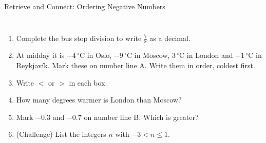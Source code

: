 \documentclass{beamer}
\newcommand{\ashow}[1]{\uncover<2->{\textcolor{red}{\small #1}}}
\newcommand{\abox}[1]{%
  \tikz[baseline=(b.base)]\node[draw=gray, densely dotted, inner sep=1.5pt] (b)
    {\alt<2->{\textcolor{red}{#1}}{\phantom{#1}}};%
}
\newcommand{\tightlist}{%
  \setlength{\itemsep}{0pt}\setlength{\parskip}{0pt}\setlength{\topsep}{0pt}%
}
\newcommand{\dC}[1]{$#1\,^{\circ}$C}
\begin{document}
\begin{frame}[t]{Retrieve and Connect: Ordering Negative Numbers}
\begin{columns}[T,onlytextwidth]
\vspace{-1.5em}
\footnotesize
\begin{enumerate}\tightlist
{}
  \item Complete the bus stop division to write $\frac78$ as a decimal.
        \ashow{$0.875$}
  \item At midday it is \dC{-4} in Oslo, \dC{-9} in Moscow, \dC{3} in London and
        \dC{-1} in Reykjavík. Mark these on number line A. Write them in order,
        coldest first.
        \ashow{$-9$, \; $-4$, \; $-1$, \; $3$}
  \item[] Write $<$ or $>$ in each box.
{\setlength{\columnsep}{14pt}%
}
  \item How many degrees warmer is London than Moscow?
        \ashow{$12$ degrees}
  \item Mark $-0.3$ and $-0.7$ on number line B. Which is greater?
        \ashow{$-0.3$, because it is further right}
  \item (Challenge) List the integers $n$ with $-3<n\leq1$.
        \ashow{$-2,\ -1,\ 0,\ 1$}
\end{enumerate}
\end{columns}
\end{frame}
\end{document}
